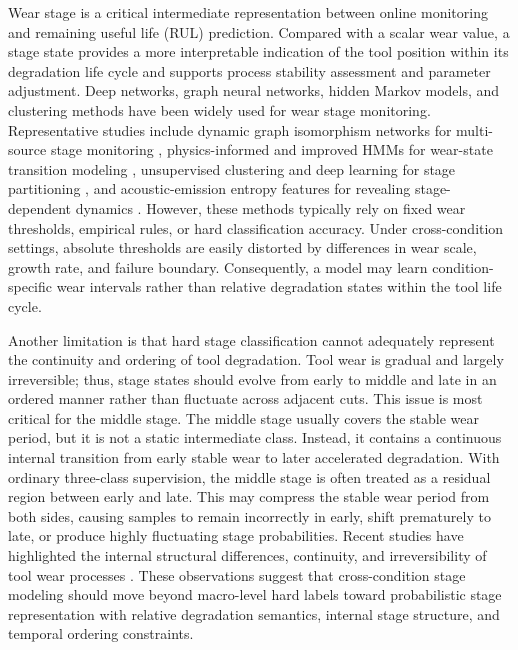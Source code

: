 \documentclass[a4paper,fleqn]{cas-sc}
\begin{document}
Wear stage is a critical intermediate representation between online monitoring and remaining useful life (RUL) prediction. Compared with a scalar wear value, a stage state provides a more interpretable indication of the tool position within its degradation life cycle and supports process stability assessment and parameter adjustment. Deep networks, graph neural networks, hidden Markov models, and clustering methods have been widely used for wear stage monitoring. Representative studies include dynamic graph isomorphism networks for multi-source stage monitoring \citep{ref3}, physics-informed and improved HMMs for wear-state transition modeling \citep{ref43,ref27}, unsupervised clustering and deep learning for stage partitioning \citep{ref32,ref26}, and acoustic-emission entropy features for revealing stage-dependent dynamics \citep{ref6}. However, these methods typically rely on fixed wear thresholds, empirical rules, or hard classification accuracy. Under cross-condition settings, absolute thresholds are easily distorted by differences in wear scale, growth rate, and failure boundary. Consequently, a model may learn condition-specific wear intervals rather than relative degradation states within the tool life cycle.

Another limitation is that hard stage classification cannot adequately represent the continuity and ordering of tool degradation. Tool wear is gradual and largely irreversible; thus, stage states should evolve from early to middle and late in an ordered manner rather than fluctuate across adjacent cuts. This issue is most critical for the middle stage. The middle stage usually covers the stable wear period, but it is not a static intermediate class. Instead, it contains a continuous internal transition from early stable wear to later accelerated degradation. With ordinary three-class supervision, the middle stage is often treated as a residual region between early and late. This may compress the stable wear period from both sides, causing samples to remain incorrectly in early, shift prematurely to late, or produce highly fluctuating stage probabilities. Recent studies have highlighted the internal structural differences, continuity, and irreversibility of tool wear processes \citep{ref40,ref20}. These observations suggest that cross-condition stage modeling should move beyond macro-level hard labels toward probabilistic stage representation with relative degradation semantics, internal stage structure, and temporal ordering constraints.
\end{document}
